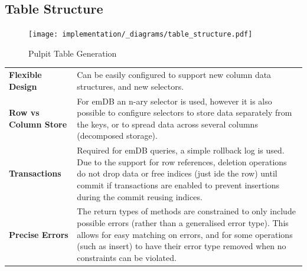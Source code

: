 \subsection{Table Structure}
\begin{figure}[h!]
    \centering
    \texttt{[image: implementation/\_diagrams/table\_structure.pdf]}
    \caption{Pulpit Table Generation}
\end{figure}
\begin{center}
    \begin{tabular}{l p{}}
        \textbf{Flexible Design}     & Can be easily configured to support new column data structures, and new selectors.                                                                                                                                                                                          \\
        \textbf{Row vs Column Store} & For emDB an n-ary selector is used, however it is also possible to configure selectors to store data separately from the keys, or to spread data across several columns (decomposed storage).                                                                               \\
        \textbf{Transactions}        & Required for emDB queries, a simple rollback log is used. Due to the support for row references, deletion operations do not drop data or free indices (just ide the row) until commit if transactions are enabled to prevent insertions during the commit reusing indices. \\
        \textbf{Precise Errors}      & The return types of methods are constrained to only include possible errors (rather than a generalised error type). This allows for easy matching on errors, and for some operations (such as insert) to have their error type removed when no constraints can be violated. \\
    \end{tabular}
\end{center}
